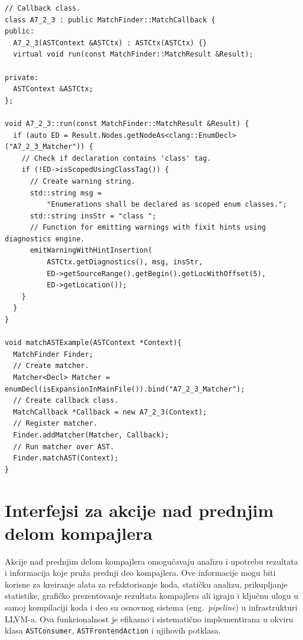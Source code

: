 \documentclass[12pt,oneside]{memoir}
\begin{document}
\begin{lstlisting}[style=customc,  caption={Primer upariva\v{c}a koji pronalazi sve deklaracije enumeratora koji nisu deklarisani koriste\'{c}i specifikator \texttt{class}. Ovaj primer demonstrira i upotrebu klasa \texttt{MatchFinder}, \texttt{MatchCallback} i \texttt{MatchResult}.}, label=lst:MatcherList]
// Callback class.
class A7_2_3 : public MatchFinder::MatchCallback {
public:
  A7_2_3(ASTContext &ASTCtx) : ASTCtx(ASTCtx) {}
  virtual void run(const MatchFinder::MatchResult &Result);

private:
  ASTContext &ASTCtx;
};

void A7_2_3::run(const MatchFinder::MatchResult &Result) {
  if (auto ED = Result.Nodes.getNodeAs<clang::EnumDecl>("A7_2_3_Matcher")) {
    // Check if declaration contains 'class' tag.
    if (!ED->isScopedUsingClassTag()) {
      // Create warning string.
      std::string msg =
          "Enumerations shall be declared as scoped enum classes.";
      std::string insStr = "class ";
      // Function for emitting warnings with fixit hints using diagnostics engine.
      emitWarningWithHintInsertion(
          ASTCtx.getDiagnostics(), msg, insStr,
          ED->getSourceRange().getBegin().getLocWithOffset(5),
          ED->getLocation());
    }
  }
}

void matchASTExample(ASTContext *Context){
  MatchFinder Finder;
  // Create matcher.
  Matcher<Decl> Matcher = enumDecl(isExpansionInMainFile()).bind("A7_2_3_Matcher");
  // Create callback class.
  MatchCallback *Callback = new A7_2_3(Context);
  // Register matcher.
  Finder.addMatcher(Matcher, Callback);
  // Run matcher over AST.
  Finder.matchAST(Context);
}
\end{lstlisting}


\section{Interfejsi za akcije nad prednjim delom kompajlera}
\label{sec:interfejsi}

Akcije nad prednjim delom kompajlera omogu\'{c}avaju analizu i upotrebu rezultata i informacija koje pru\v{z}a prednji deo kompajlera. Ove informacije mogu biti korisne za kreiranje alata za refaktorisanje koda, stati\v{c}ku analizu, prikupljanje statistike, grafi\v{c}ko prezentovanje rezultata kompajlera ali igraju i klju\v{c}nu ulogu u samoj kompilaciji koda i deo su osnovnog sistema (eng.~\textit{pipeline}) u infrastrukturi LLVM-a.
Ova funkcionalnost je efikasno i sistemati\v{c}no implementirana u okviru klasa \texttt{ASTConsumer}, \texttt{ASTFrontendAction} i njihovih potklasa.
\end{document}
